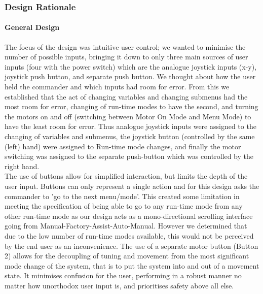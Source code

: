 \documentclass{article}
\begin{document}
	
	\subsubsection{Design Rationale}
	\paragraph{General Design}
	The focus of the design was intuitive user control; we wanted to minimise the number of possible inputs, bringing it down to only three main sources of user inputs (four with the power switch) which are the analogue joystick inputs (x-y), joystick push button, and separate push button. We thought about how the user held the commander and which inputs had room for error. From this we established that the act of changing variables and changing submenus had the most room for error, changing of run-time modes to have the second, and turning the motors on and off (switching between Motor On Mode and Menu Mode) to have the least room for error. Thus analogue joystick inputs were assigned to the changing of variables and submenus, the joystick button (controlled by the same (left) hand) were assigned to Run-time mode changes, and finally the motor switching was assigned to the separate push-button which was controlled by the right hand.\\
	
	The use of buttons allow for simplified interaction, but limits the depth of the user input. Buttons can only represent a single action and for this design asks the commander to 'go to the next menu/mode'. This created some limitation in meeting the specification of being able to go to any run-time mode from any other run-time mode as our design acts as a mono-directional scrolling interface going from Manual-Factory-Assist-Auto-Manual. However we determined that due to the low number of run-time modes available, this would not be perceived by the end user as an inconvenience. The use of a separate motor button (Button 2) allows for the decoupling of tuning and movement from the most significant mode change of the system, that is to put the system into and out of a movement state. It minimises confusion for the user, performing in a robust manner no matter how unorthodox user input is, and prioritises safety above all else.
	
\end{document}
